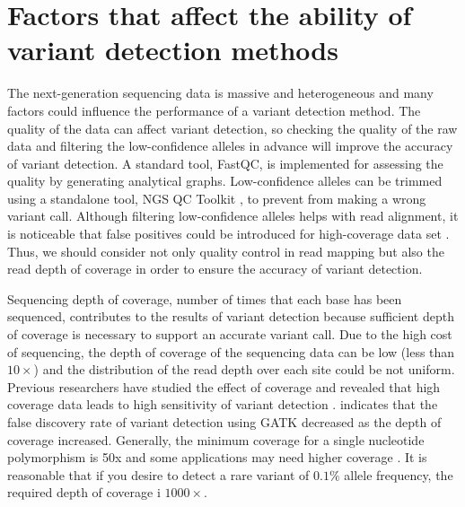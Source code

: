 \documentclass[11pt,reqno]{amsart}
\begin{document}
\section{Factors that affect the ability of variant detection methods}
The next-generation sequencing data is massive and heterogeneous and many factors could influence the performance of a variant detection method.
The quality of the data can affect variant detection, so checking the quality of the raw data and filtering the low-confidence alleles in advance will improve the accuracy of variant detection.
A standard tool, FastQC, is implemented for assessing the quality by generating analytical graphs.
Low-confidence alleles can be trimmed using a standalone tool, NGS QC Toolkit \citep{patel2012ngs}, to prevent from making a wrong variant call.
Although filtering low-confidence alleles helps with read alignment, it is noticeable that false positives could be introduced for high-coverage data set \citep{liu2012steps}.
Thus, we should consider not only quality control in read mapping but also the read depth of coverage in order to ensure the accuracy of variant detection.

Sequencing depth of coverage, number of times that each base has been sequenced, contributes to the results of variant detection because sufficient depth of coverage is necessary to support an accurate variant call.
Due to the high cost of sequencing, the depth of coverage of the sequencing data can be low (less than $10\times$) and the distribution of the read depth over each site could be not uniform.
Previous researchers have studied the effect of coverage and revealed that high coverage data leads to high sensitivity of variant detection \citep{neuman2013analysis, krawitz2010microindel}.
\citep{liu2013variant} indicates that the false discovery rate of variant detection using GATK decreased as the depth of coverage increased.
Generally, the minimum coverage for a single nucleotide polymorphism is 50x and some applications may need higher coverage \citep{Schlotterer2014}.
It is reasonable that if you desire to detect a rare variant of $0.1 \%$ allele frequency, the required depth of coverage i $1000\times$.
\end{document}
